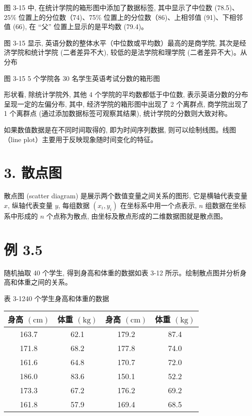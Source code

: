 \documentclass[10pt]{article}
\begin{document}
\begin{CJK*}{UTF8}{bsmi}
图 3-15 中, 在统计学院的箱形图中添加了数据标签, 其中显示了中位数 (78.5)、 $25 \%$ 位置上的分位数（74)、75\% 位置上的分位数（86)、上相邻值 (91)、下相邻值 (66), 在 “父” 位置上显示的是平均数 (79.4)。

图 3-15 显示, 英语分数的整体水平（中位数或平均数）最高的是商学院, 其次是经济学院和统计学院 (二者差异不大), 较低的是法学院和理学院 (二者差异不大)。从分布

\begin{center}
\end{center}

图 3-15 5 个学院各 30 名学生英语考试分数的箱形图

形状看, 除统计学院外, 其他 4 个学院的平均数都低于中位数, 表示英语分数的分布呈现一定的左偏分布, 其中, 经济学院的箱形图中出现了 2 个离群点, 商学院出现了 1 个离群点 (通过添加数据标签可观察其结果), 统计学院的分数则大致对称。

如果数值数据是在不同时间取得的, 即为时间序列数据, 则可以绘制线图。线图 （line plot）主要用于反映现象随时间变化的特征。

\section*{3. 散点图}
散点图 (scatter diagram) 是展示两个数值变量之间关系的图形, 它是横轴代表变量 $x$, 纵轴代表变量 $y$, 每组数据 $\left(x_{i}, y_{i}\right)$ 在坐标系中用一个点表示, $n$ 组数据在坐标系中形成的 $n$ 个点称为散点, 由坐标及散点形成的二维数据图就是散点图。

\section*{例 3.5}
随机抽取 40 个学生, 得到身高和体重的数据如表 3-12 所示。绘制散点图并分析身高和体重之间的关系。

表 3-1240 个学生身高和体重的数据

\begin{center}
\begin{tabular}{cc||cc}
\hline
身高 $(\mathrm{cm})$ & 体重 $(\mathrm{kg})$ & 身高 $(\mathrm{cm})$ & 体重 $(\mathrm{kg})$ \\
\hline
163.7 & 62.1 & 179.2 & 87.4 \\
171.8 & 68.2 & 177.8 & 74.0 \\
161.6 & 64.8 & 170.7 & 72.0 \\
186.0 & 83.6 & 150.1 & 52.2 \\
173.3 & 67.2 & 176.2 & 69.2 \\
161.8 & 57.9 & 169.4 & 68.5 \\
\hline
\end{tabular}
\end{center}


\end{CJK*}
\end{document}
